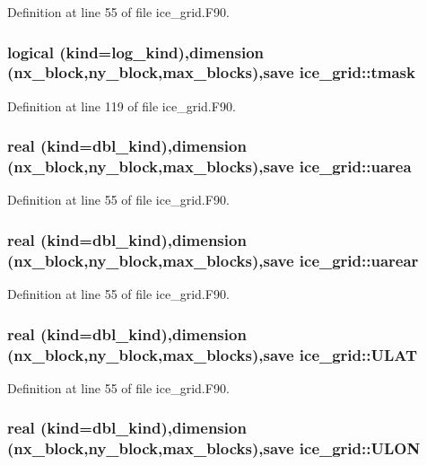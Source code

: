 Definition at line 55 of file ice\_\-grid.F90.\hypertarget{namespaceice__grid_a5de6731a3b8601be3495a4c306832bf0}{
\subsubsection[{tmask}]{\setlength{\rightskip}{0pt plus 5cm}logical (kind=log\_\-kind),dimension (nx\_\-block,ny\_\-block,max\_\-blocks),save {\bf ice\_\-grid::tmask}}}
\label{namespaceice__grid_a5de6731a3b8601be3495a4c306832bf0}


Definition at line 119 of file ice\_\-grid.F90.\hypertarget{namespaceice__grid_aa8008e6fedd2e53d57bee5d6fa898de9}{
\subsubsection[{uarea}]{\setlength{\rightskip}{0pt plus 5cm}real (kind=dbl\_\-kind),dimension (nx\_\-block,ny\_\-block,max\_\-blocks),save {\bf ice\_\-grid::uarea}}}
\label{namespaceice__grid_aa8008e6fedd2e53d57bee5d6fa898de9}


Definition at line 55 of file ice\_\-grid.F90.\hypertarget{namespaceice__grid_acf709799675ca52c31d335eb09a46fcf}{
\subsubsection[{uarear}]{\setlength{\rightskip}{0pt plus 5cm}real (kind=dbl\_\-kind),dimension (nx\_\-block,ny\_\-block,max\_\-blocks),save {\bf ice\_\-grid::uarear}}}
\label{namespaceice__grid_acf709799675ca52c31d335eb09a46fcf}


Definition at line 55 of file ice\_\-grid.F90.\hypertarget{namespaceice__grid_a98cabaeec38bbcfe0d2844d8dae12434}{
\subsubsection[{ULAT}]{\setlength{\rightskip}{0pt plus 5cm}real (kind=dbl\_\-kind),dimension (nx\_\-block,ny\_\-block,max\_\-blocks),save {\bf ice\_\-grid::ULAT}}}
\label{namespaceice__grid_a98cabaeec38bbcfe0d2844d8dae12434}


Definition at line 55 of file ice\_\-grid.F90.\hypertarget{namespaceice__grid_a15766c63c75fd52d6d8ea3d651ecba26}{
\subsubsection[{ULON}]{\setlength{\rightskip}{0pt plus 5cm}real (kind=dbl\_\-kind),dimension (nx\_\-block,ny\_\-block,max\_\-blocks),save {\bf ice\_\-grid::ULON}}}
\label{namespaceice__grid_a15766c63c75fd52d6d8ea3d651ecba26}


